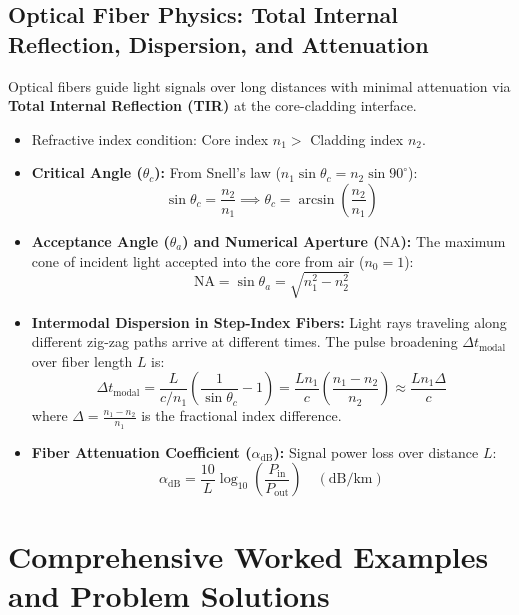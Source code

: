 \subsection{Optical Fiber Physics: Total Internal Reflection, Dispersion, and Attenuation}
Optical fibers guide light signals over long distances with minimal attenuation via \textbf{Total Internal Reflection (TIR)} at the core-cladding interface.
\begin{itemize}
    \item Refractive index condition: Core index $n_1 >$ Cladding index $n_2$.
    \item \textbf{Critical Angle ($\theta_c$):} From Snell's law ($n_1 \sin \theta_c = n_2 \sin 90^\circ$):
    \begin{equation}
        \sin \theta_c = \frac{n_2}{n_1} \implies \theta_c = \arcsin\left(\frac{n_2}{n_1}\right)
    \end{equation}
    \item \textbf{Acceptance Angle ($\theta_a$) and Numerical Aperture ($\text{NA}$):} The maximum cone of incident light accepted into the core from air ($n_0 = 1$):
    \begin{equation}
        \text{NA} = \sin \theta_a = \sqrt{n_1^2 - n_2^2}
    \end{equation}
    \item \textbf{Intermodal Dispersion in Step-Index Fibers:} Light rays traveling along different zig-zag paths arrive at different times. The pulse broadening $\Delta t_{\text{modal}}$ over fiber length $L$ is:
    \begin{equation}
        \Delta t_{\text{modal}} = \frac{L}{c/n_1}\left(\frac{1}{\sin \theta_c} - 1\right) = \frac{L n_1}{c}\left(\frac{n_1 - n_2}{n_2}\right) \approx \frac{L n_1 \Delta}{c}
    \end{equation}
    where $\Delta = \frac{n_1 - n_2}{n_1}$ is the fractional index difference.
    \item \textbf{Fiber Attenuation Coefficient ($\alpha_{\text{dB}}$):} Signal power loss over distance $L$:
    \begin{equation}
        \alpha_{\text{dB}} = \frac{10}{L} \log_{10}\left(\frac{P_{\text{in}}}{P_{\text{out}}}\right) \quad (\text{dB/km})
    \end{equation}
\end{itemize}

\section{Comprehensive Worked Examples and Problem Solutions}

